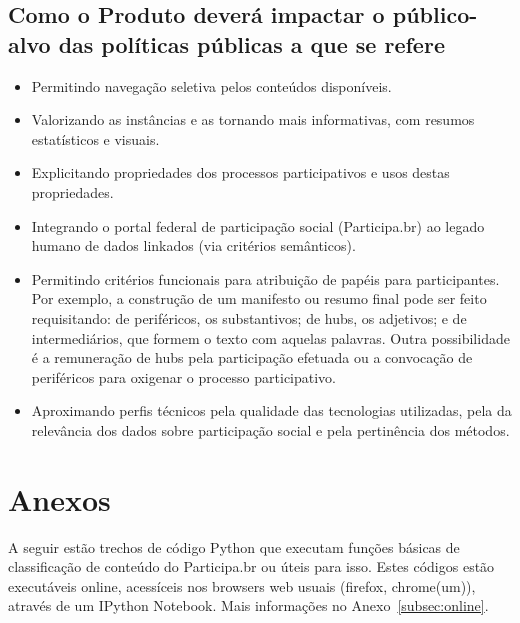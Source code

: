 \documentclass[12pt]{article}
\begin{document}
\subsection{Como o Produto deverá impactar o público-alvo das políticas públicas a que se refere}
\begin{itemize}
    \item Permitindo navegação seletiva pelos conteúdos disponíveis.
    \item Valorizando as instâncias e as tornando mais informativas, com resumos estatísticos e visuais.
    \item Explicitando propriedades dos processos participativos e usos destas propriedades.
    \item Integrando o portal federal de participação social (Participa.br) ao legado humano de dados linkados (via critérios semânticos).
    \item Permitindo critérios funcionais para atribuição de papéis para participantes. Por exemplo, a construção de um manifesto ou resumo final pode ser feito requisitando: de periféricos, os substantivos; de hubs, os adjetivos; e de intermediários, que formem o texto com aquelas palavras. Outra possibilidade é a remuneração de hubs pela participação efetuada ou a convocação de periféricos para oxigenar o processo participativo.
    \item Aproximando perfis técnicos pela qualidade das tecnologias utilizadas, pela da relevância dos dados sobre participação social e pela pertinência dos métodos.
\end{itemize}


\newpage

\newpage

\newpage
\printindex
\newpage
%
\appendix
\section*{Anexos}
A seguir estão trechos de código Python que executam funções básicas de classificação de conteúdo do Participa.br ou úteis para isso.
Estes códigos estão executáveis online, acessíceis nos browsers web usuais (firefox, chrome(um)), através de um IPython Notebook. Mais informações no Anexo~\ref{subsec:online}.
\newcommand\invisiblesection[1]{%
  \refstepcounter{section}%
  \addcontentsline{toc}{section}{\protect\numberline{\thesection}#1}%
  \sectionmark{#1}}
\newcommand\invisiblesubsection[1]{%
  \refstepcounter{subsection}%
  \addcontentsline{toc}{subsection}{\protect\numberline{\thesubsection}#1}%
  \subsectionmark{#1}}
\end{document}
